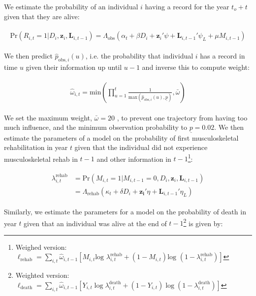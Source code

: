 \documentclass[a4paper,12pt]{article}
\theoremstyle{plain}
\theoremstyle{definition}
\theoremstyle{TheoremNum}
\theoremstyle{CorollaryNum}
\theoremstyle{PropositionNum}
\theoremstyle{TheoremNum}
\begin{document}
We estimate the probability of an individual $i$ having a record for the year $t_o + t$ given that they are alive:

\begin{align}
\begin{split}
\text{Pr}(R_{i,t}=1 | D_i,\mathbf{z}_i, \mathbf{L}_{i,t-1}) = \Lambda_{\text{obs}}(\alpha_t + \beta D_i + \mathbf{z}_i'\psi + \mathbf{L}_{i,t-1}'\psi_L + \mu M_{i,t-1})
\end{split}
\tag{3}\label{eq:rq2_0_present}
\end{align}

We then predict $\hat{p}_{\text{obs},i}(u)$, i.e. the probability that individual $i$ has a record in time $u$ given their information up until $u-1$ and inverse this to compute weight:

\begin{align}
\begin{split}
\hat{\omega}_{i,t} = \text{min} \left(\prod_{u=1}^t \frac{1}{\text{max}\left(\hat{p}_{\text{obs},i}(u),\underline{p}\right)}, \bar{\omega}\right)
\end{split}
\tag{4}\label{eq:rq2_0_weights}
\end{align}

We set the maximum weight, $\bar{\omega} = 20$ , to prevent one trajectory from having too much influence, and the minimum observation probability to $\underline{p}=0.02$. We then estimate the parameters of a model on the probability of first musculoskeletal rehabilitation in year $t$ given that the individual did not experience musculoskeletal rehab in $t-1$ and other information in $t-1$\footnote{Weighed version: $\ell_{\text{rehab}} = \sum_{i,t} \hat{\omega}_{i,t-1} \left[M_{i,t}\text{log } \lambda_{i,t}^{\text{rehab}} + \left(1-M_{i,t} \right)\text{log } \left(1-\lambda_{i,t}^{\text{rehab}}\right)\right]$}:

\begin{align}
\begin{split}
\lambda_{i,t}^{\text{rehab}} &=
\text{Pr}(M_{i,t}=1 | M_{i,t-1}=0, D_i, \mathbf{z}_i, \mathbf{L}_{i,t-1}) \\ & = \Lambda_{\text{rehab}}(\kappa_t + \delta D_i + \mathbf{z_i}'\eta + \mathbf{L}_{i,t-1}'\eta_L )
\end{split}
\tag{5}\label{eq:rq2_1_unweighted}
\end{align}


Similarly, we estimate the parameters for a model on the probability of death in year $t$ given that an individual was alive at the end of $t-1$\footnote{Weighted version: $\ell_{\text{death}} = \sum_{i,t} \hat{\omega}_{i,t-1} \left[Y_{i,t}\log \lambda_{i,t}^{\text{death}} + \left(1-Y_{i,t} \right)\log \left(1-\lambda_{i,t}^{\text{death}}\right)\right]$} is given by:
\end{document}
